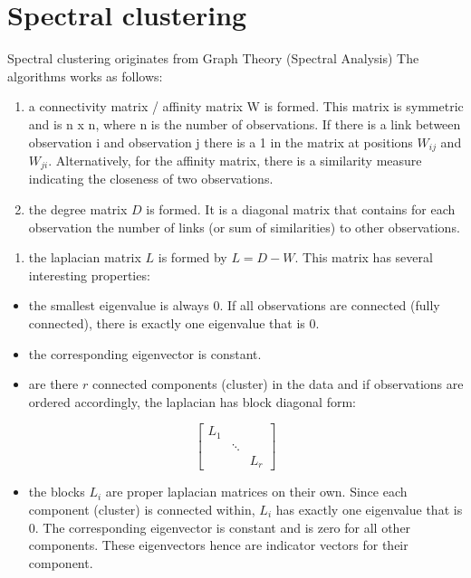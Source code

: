 \documentclass[letterpaper,10pt,english]{jupyterBook}
\begin{document}
\section{Spectral clustering}
\label{\detokenize{Text_Clustering:spectral-clustering}}
\sphinxAtStartPar
Spectral clustering originates from Graph Theory (Spectral Analysis)
The algorithms works as follows:
\begin{enumerate}
%
\item {} 
\sphinxAtStartPar
a connectivity matrix / affinity matrix W is formed. This matrix is symmetric and is n x n, where n is the number of observations. If there is a link between observation i and observation j there is a 1 in the matrix at positions \(W_{ij}\) and \(W_{ji}\). Alternatively, for the affinity matrix, there is a similarity measure indicating the closeness of two observations.

\item {} 
\sphinxAtStartPar
the degree matrix \(D\) is formed. It is a diagonal matrix that contains for each observation the number of links (or sum of similarities) to other observations.

\end{enumerate}
\begin{enumerate}
%
\item {} 
\sphinxAtStartPar
the laplacian matrix \(L\) is formed by \(L = D -W\). This matrix has several interesting properties:

\end{enumerate}
\begin{itemize}
\item {} 
\sphinxAtStartPar
the smallest eigenvalue is always 0. If all observations are connected (fully connected), there is exactly one eigenvalue that is 0.

\item {} 
\sphinxAtStartPar
the corresponding eigenvector is constant.

\item {} 
\sphinxAtStartPar
are there \(r\) connected components (cluster) in the data and if observations are ordered accordingly, the laplacian has block diagonal form:

\end{itemize}
\begin{equation*}   
 \begin{bmatrix}
   L_{1} & & \\
   & \ddots & \\
   & & L_{r}
 \end{bmatrix}
\end{equation*}\begin{itemize}
\item {} 
\sphinxAtStartPar
the blocks \(L_i\) are proper laplacian matrices on their own. Since each component (cluster) is connected within, \(L_i\) has exactly one eigenvalue that is 0. The corresponding eigenvector is constant and is zero for all other components. These eigenvectors hence are indicator vectors for their component.

\end{itemize}
\end{document}
